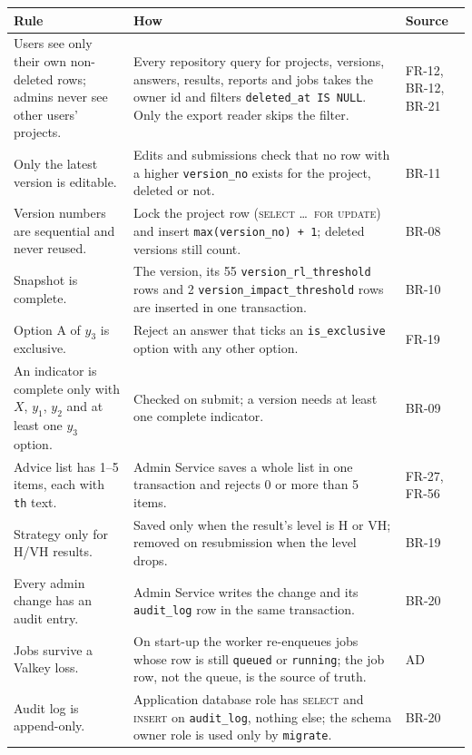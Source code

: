 \documentclass[11pt,a4paper]{article}
\newcommand{\tb}[1]{\texttt{#1}}
\begin{document}
{\small
\begin{longtable}{@{}R{5.0cm} R{8.9cm} R{2.2cm}@{}}
\toprule{}Rule & How & Source \\ \midrule\endhead
Users see only their own non-deleted rows; admins never see other users' projects. & Every repository query for projects, versions, answers, results, reports and jobs takes the owner id and filters \tb{deleted\_at IS NULL}. Only the export reader skips the filter. & FR-12, BR-12, BR-21 \\
Only the latest version is editable. & Edits and submissions check that no row with a higher \tb{version\_no} exists for the project, deleted or not. & BR-11 \\
Version numbers are sequential and never reused. & Lock the project row (\textsc{select \dots\ for update}) and insert \tb{max(version\_no) + 1}; deleted versions still count. & BR-08 \\
Snapshot is complete. & The version, its 55 \tb{version\_rl\_threshold} rows and 2 \tb{version\_impact\_threshold} rows are inserted in one transaction. & BR-10 \\
Option A of $y_3$ is exclusive. & Reject an answer that ticks an \tb{is\_exclusive} option with any other option. & FR-19 \\
An indicator is complete only with $X$, $y_1$, $y_2$ and at least one $y_3$ option. & Checked on submit; a version needs at least one complete indicator. & BR-09 \\
Advice list has 1--5 items, each with \tb{th} text. & Admin Service saves a whole list in one transaction and rejects 0 or more than 5 items. & FR-27, FR-56 \\
Strategy only for H/VH results. & Saved only when the result's level is H or VH; removed on resubmission when the level drops. & BR-19 \\
Every admin change has an audit entry. & Admin Service writes the change and its \tb{audit\_log} row in the same transaction. & BR-20 \\
Jobs survive a Valkey loss. & On start-up the worker re-enqueues jobs whose row is still \tb{queued} or \tb{running}; the job row, not the queue, is the source of truth. & AD \\
Audit log is append-only. & Application database role has \textsc{select} and \textsc{insert} on \tb{audit\_log}, nothing else; the schema owner role is used only by \tb{migrate}. & BR-20 \\
\bottomrule
\end{longtable}}
\end{document}
